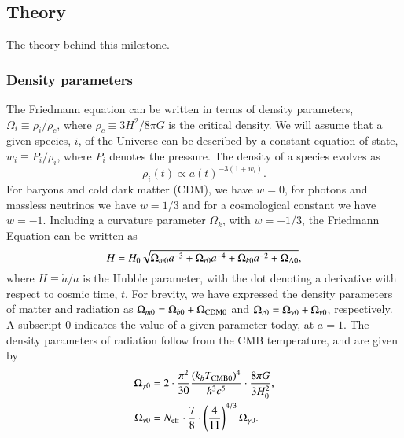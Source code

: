 

\subsection{Theory}\label{M1:theory}
The theory behind this milestone. 



\subsubsection{Density parameters}

The Friedmann equation can be written in terms of density parameters, $\Omega_i\equiv \rho_i/\rho_c$, where $\rho_c\equiv 3H^2/8\pi G$ is the critical density. We will assume that a given species, $i$, of the Universe can be described by a constant equation of state, $w_i \equiv P_i/\rho_i$, where $P_i$ denotes the pressure. The density of a species evolves as \cite[Eq. (2.72)]{Dodelson}
\begin{equation}
    \rho_i(t)\propto a(t)^{-3(1+w_i)}. \label{eq:M1:theory:rho_i_eos_dependence}
\end{equation}
For baryons and cold dark matter (CDM), we have $w=0$, for photons and massless neutrinos  we have $w=1/3$ and for a cosmological constant we have $w=-1$. Including a curvature parameter $\Omega_k$, with $w=-1/3$, the Friedmann Equation can be written as \cite[Eq. (3.14)]{Dodelson}  
\begin{equation}
    H = H_0 \sqrt{\Omega_{m0} a^{-3} + \Omega_{r0} a^{-4} + \Omega_{k0} a^{-2} + \Omega_{\Lambda 0}}, \label{eq:M1:theory:Friedmann_H_omegas}
\end{equation}
where $H\equiv\dot{a}/a$ is the Hubble parameter, with the dot denoting a derivative with respect to cosmic time, $t$. For brevity, we have expressed the density parameters of matter and radiation as $\Omega_{m0}=\Omega_{b0}+\Omega_\mathrm{CDM0}$ and $\Omega_{r0}=\Omega_{\gamma 0}+\Omega_{\nu 0}$, respectively. A subscript $0$ indicates the value of a given parameter today, at $a=1$. The density parameters of radiation follow from the CMB temperature, and are given by 
\begin{align}
    \Omega_{\gamma 0} &= 2 \cdot \frac{\pi^2}{30} \frac{(k_b T_\mathrm{CMB0})^4}{\hbar^3 c^5} \cdot \frac{8\pi G}{3H_0^2}, \label{eq:M1:theory:omega_gamma0_T} \\
    \Omega_{\nu 0} &= N_\mathrm{eff} \cdot \frac{7}{8} \cdot \left( \frac{4}{11} \right)^{4/3} \Omega_{\gamma 0}. \label{eq:M1:theory:omega_nu0_T}
\end{align}
